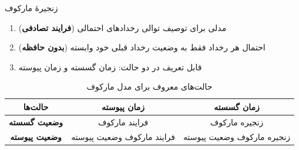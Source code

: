 \documentclass[xcolor=dvipsnames, professionalfonts, aspectratio=169, 11pt]{beamer}
\begin{document}
\begin{persian}
\begin{frame}
	زنجیرهٔ مارکوف
	\begin{enumerate}
		\item مدلی برای توصیف توالی رخدادهای احتمالی (\textbf{فرایند تصادفی})
		\item احتمال هر رخداد فقط به وضعیت رخداد قبلی خود وابسته (\textbf{بدون حافظه})
		\item قابل تعریف در دو حالت: زمان گسسته و زمان پیوسته
	\end{enumerate}
	\pause
	\begin{table}
		\caption{حالت‌های معروف برای مدل مارکوف}
		\vspace{0em}
		\small
		\begin{tabular}{|c|c|c|}
			\hline
			\textbf{حالت‌ها}       & \textbf{زمان پیوسته}       & \textbf{زمان گسسته}        \\
			\hline
			\textbf{وضعیت گسسته}  & فرایند مارکوف              & زنجیره مارکوف              \\
			\hline
			\textbf{وضعیت پیوسته} & فرایند مارکوف وضعیت پیوسته & زنجیره مارکوف وضعیت پیوسته \\
			\hline
		\end{tabular}
	\end{table}
	
\end{frame}




%
%
%
%


\end{persian}
\end{document}
